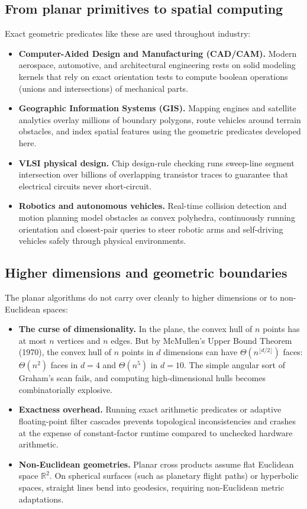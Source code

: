 \subsection{From planar primitives to spatial computing}

Exact geometric predicates like these are used throughout industry:
\begin{itemize}
  \item \textbf{Computer-Aided Design and Manufacturing (CAD/CAM).} Modern
        aerospace, automotive, and architectural engineering rests on solid
        modeling kernels that rely on exact orientation tests to compute boolean
        operations (unions and intersections) of mechanical parts.
  \item \textbf{Geographic Information Systems (GIS).} Mapping engines and
        satellite analytics overlay millions of boundary polygons, route
        vehicles around terrain obstacles, and index spatial features using the
        geometric predicates developed here.
  \item \textbf{VLSI physical design.} Chip design-rule checking runs sweep-line
        segment intersection over billions of overlapping transistor traces to
        guarantee that electrical circuits never short-circuit.
  \item \textbf{Robotics and autonomous vehicles.} Real-time collision detection
        and motion planning model obstacles as convex polyhedra, continuously
        running orientation and closest-pair queries to steer robotic arms and
        self-driving vehicles safely through physical environments.
\end{itemize}

\subsection{Higher dimensions and geometric boundaries}

The planar algorithms do not carry over cleanly to higher dimensions or to
non-Euclidean spaces:
\begin{itemize}
  \item \textbf{The curse of dimensionality.} In the plane, the convex hull of $n$ points
        has at most $n$ vertices and $n$ edges. But by McMullen's Upper Bound Theorem (1970),
        the convex hull of $n$ points in $d$ dimensions can have $\Theta(n^{\lfloor d/2 \rfloor})$
        faces: $\Theta(n^2)$ faces in $d=4$ and $\Theta(n^5)$ in $d=10$. The simple angular sort
        of Graham's scan fails, and computing high-dimensional hulls becomes combinatorially explosive.
  \item \textbf{Exactness overhead.} Running exact arithmetic predicates or adaptive floating-point
        filter cascades prevents topological inconsistencies and crashes at the expense of constant-factor
        runtime compared to unchecked hardware arithmetic.
  \item \textbf{Non-Euclidean geometries.} Planar cross products assume flat Euclidean space $\mathbb{R}^2$.
        On spherical surfaces (such as planetary flight paths) or hyperbolic spaces, straight lines bend
        into geodesics, requiring non-Euclidean metric adaptations.
\end{itemize}

